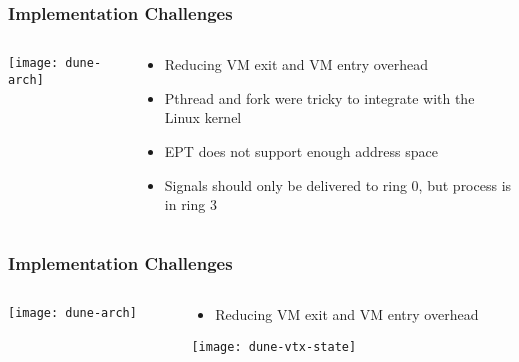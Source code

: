 \begin{frame}[plain]
	\frametitle{ Implementation	 Challenges}
	
	
	
	\begin{columns}
		
		\begin{column}{.4\textwidth}
			
			
			\texttt{[image: dune-arch]}
			
		\end{column}
		
		\begin{column}{.6\textwidth}
			\begin{itemize}
			\item Reducing	VM	 exit	 and	 VM	 entry	 overhead		
			\item Pthread	 and	 fork	 were	 tricky	 to	 integrate	 with	the	 Linux	 kernel	
			\item EPT	 does	 not	 support	 enough	 address	 space	
			\item Signals	 should	 only	 be	 delivered	 to	 ring	 0, but process is in ring 3

			\end{itemize}
		\end{column}
		
		
	\end{columns}
	
	
\end{frame}


\begin{frame}[plain]
	\frametitle{ Implementation	 Challenges}
	
	
	
	\begin{columns}
		
		\begin{column}{.4\textwidth}
			
			
			\texttt{[image: dune-arch]}
			
		\end{column}
		
		\begin{column}{.6\textwidth}
			\begin{itemize}
				\item Reducing	VM	 exit	 and	 VM	 entry	 overhead
			\end{itemize}
		
		\texttt{[image: dune-vtx-state]}
		\end{column}
		
		
	\end{columns}
	
	
\end{frame}


